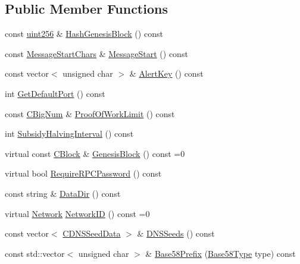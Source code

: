 \subsection*{Public Member Functions}
\begin{DoxyCompactItemize}
\item 
const \hyperlink{classuint256}{uint256} \& \hyperlink{class_c_chain_params_a40411665bb7ca75a8758d33594901e91}{Hash\+Genesis\+Block} () const 
\item 
const \hyperlink{chainparams_8h_a606a5a0100b84686ef50bf2cb2a591a0}{Message\+Start\+Chars} \& \hyperlink{class_c_chain_params_aed24d767f003a1b963d10fcc490e5c31}{Message\+Start} () const 
\item 
const vector$<$ unsigned char $>$ \& \hyperlink{class_c_chain_params_aff2037b134fae4df26ee17ddb13e0d3e}{Alert\+Key} () const 
\item 
int \hyperlink{class_c_chain_params_afdb7793273cdb87cc5fd75450eb2258b}{Get\+Default\+Port} () const 
\item 
const \hyperlink{class_c_big_num}{C\+Big\+Num} \& \hyperlink{class_c_chain_params_ad44a223db9e6e744d56007e0700a90b3}{Proof\+Of\+Work\+Limit} () const 
\item 
int \hyperlink{class_c_chain_params_a22301443ebfa49c61f9a7d75b03a84f2}{Subsidy\+Halving\+Interval} () const 
\item 
virtual const \hyperlink{class_c_block}{C\+Block} \& \hyperlink{class_c_chain_params_abee677792d8f64e9dc766738ca0fbb55}{Genesis\+Block} () const =0
\item 
virtual bool \hyperlink{class_c_chain_params_a8020e6cada6b54010640f4ebd3918615}{Require\+R\+P\+C\+Password} () const 
\item 
const string \& \hyperlink{class_c_chain_params_ad11dd170e65650ff4b12d45a32b9c774}{Data\+Dir} () const 
\item 
virtual \hyperlink{class_c_chain_params_a5c4bb1d7c0205399ff06ee58fab7f176}{Network} \hyperlink{class_c_chain_params_a90dc493ec0c0325c98c3ac06eb99862b}{Network\+I\+D} () const =0
\item 
const vector$<$ \hyperlink{struct_c_d_n_s_seed_data}{C\+D\+N\+S\+Seed\+Data} $>$ \& \hyperlink{class_c_chain_params_a6ad644576193885d2be4959abd2a7317}{D\+N\+S\+Seeds} () const 
\item 
const std\+::vector$<$ unsigned char $>$ \& \hyperlink{class_c_chain_params_a6088d3a4f45d89c90e7e6117c3c5720d}{Base58\+Prefix} (\hyperlink{class_c_chain_params_aa294058ec2e3586bd8d03d6c39667058}{Base58\+Type} type) const 
\item 

\end{DoxyCompactItemize}
